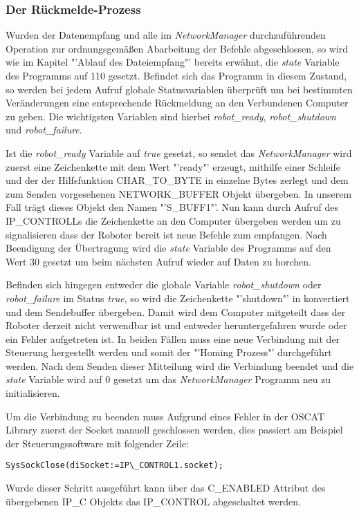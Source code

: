 \subsubsection{Der Rückmelde-Prozess}
Wurden der Datenempfang und alle im \textit{NetworkManager} durchzuführenden Operation zur ordnungsgemäßen Abarbeitung der Befehle abgeschlossen, so wird wie im Kapitel "'Ablauf des Dateiempfang"' bereits erwähnt, die \textit{state} Variable des Programms auf 110 gesetzt. Befindet sich das Programm in diesem Zustand, so werden bei jedem Aufruf globale Statusvariablen überprüft um bei bestimmten Veränderungen eine entsprechende Rückmeldung an den Verbundenen Computer zu geben. Die wichtigsten Variablen sind hierbei \textit{robot\_ready}, \textit{robot\_shutdown} und \textit{robot\_failure}.

Ist die \textit{robot\_ready} Variable auf \textit{true} gesetzt, so sendet das \textit{NetworkManager} wird zuerst eine Zeichenkette mit dem Wert "'ready"' erzeugt, mithilfe einer Schleife und der der Hilfsfunktion CHAR\_TO\_BYTE in einzelne Bytes zerlegt und dem zum Senden vorgesehenen NETWORK\_BUFFER Objekt übergeben. In unserem Fall trägt dieses Objekt den Namen "'S\_BUFF1"'. Nun kann durch Aufruf des IP\_CONTROLLs die Zeichenkette an den Computer übergeben werden um zu signalisieren dass der Roboter bereit ist neue Befehle zum empfangen. Nach Beendigung der Übertragung wird die \textit{state} Variable des Programms auf den Wert 30 gesetzt um beim nächsten Aufruf wieder auf Daten zu horchen.

Befinden sich hingegen entweder die globale Variable \textit{robot\_shutdown} oder \textit{robot\_failure} im Status \textit{true}, so wird die Zeichenkette "'shutdown"' in konvertiert und dem Sendebuffer übergeben. Damit wird dem Computer mitgeteilt dass der Roboter derzeit nicht verwendbar ist und entweder heruntergefahren wurde oder ein Fehler aufgetreten ist. In beiden Fällen muss eine neue Verbindung mit der Steuerung hergestellt werden und somit der "'Homing Prozess"' durchgeführt werden. Nach dem Senden dieser Mitteilung wird die Verbindung beendet und die \textit{state} Variable wird auf 0 gesetzt um das \textit{NetworkManager} Programm neu zu initialisieren. 

Um die Verbindung zu beenden muss Aufgrund eines Fehler in der OSCAT Library zuerst der Socket manuell geschlossen werden, dies passiert am Beispiel der Steuerungssoftware mit folgender Zeile:
\begin{lstlisting}[language = codesysls, captionpos=b, caption={Manuelles Schließen des Sockets}]
SysSockClose(diSocket:=IP\_CONTROL1.socket);
\end{lstlisting}
Wurde dieser Schritt ausgeführt kann über das C\_ENABLED Attribut des übergebenen IP\_C Objekts das IP\_CONTROL abgeschaltet werden.


